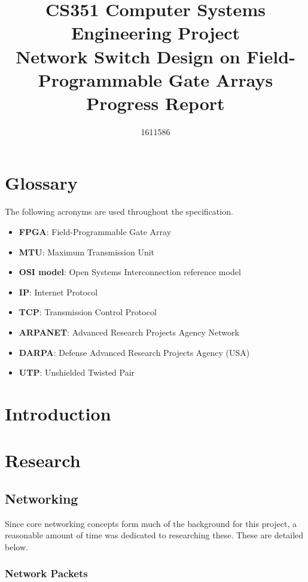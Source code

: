 \documentclass[12pt, a4paper, twoside, onecolumn]{article}
\title{CS351 Computer Systems Engineering Project \\ \vspace{0.5cm} Network Switch Design on Field-Programmable Gate Arrays \\ \vspace{0.3cm} \Large{Progress Report}}
\author{1611586}
\begin{document}


\tableofcontents
\newpage

\section{Glossary}
\label{glossary}
The following acronyms are used throughout the specification.
\begin{itemize}
  \item \textbf{FPGA}: Field-Programmable Gate Array
  \item \textbf{MTU}: Maximum Transmission Unit
  \item \textbf{OSI model}: Open Systems Interconnection reference model
  \item \textbf{IP}: Internet Protocol
  \item \textbf{TCP}: Transmission Control Protocol
  \item \textbf{ARPANET}: Advanced Research Projects Agency Network
  \item \textbf{DARPA}: Defense Advanced Research Projects Agency (USA)
  \item \textbf{UTP}: Unshielded Twisted Pair
\end{itemize}

\section{Introduction}
\label{introduction}




\section{Research}
\label{research}

\subsection{Networking}
Since core networking concepts form much of the background for this project, a reasonable amount of time was dedicated to researching these. These are detailed below.

\subsubsection{Network Packets}
\label{network_packets}
\end{document}
